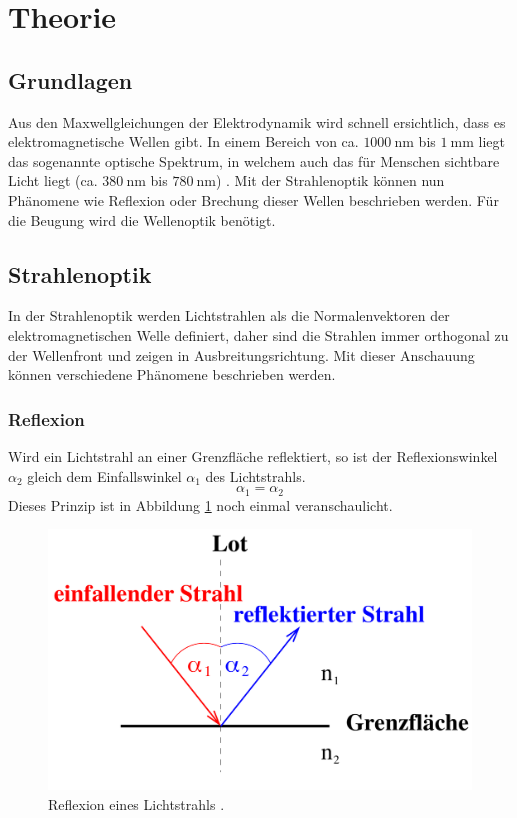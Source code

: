 \section{Theorie}
\label{sec:Theorie}

\subsection{Grundlagen}
\label{sec:grundlagen}
Aus den Maxwellgleichungen der Elektrodynamik wird schnell ersichtlich, dass es elektromagnetische Wellen
gibt. In einem Bereich von ca. $\SI{1000}{\nano\metre}$ bis $\SI{1}{\milli\metre}$ liegt das sogenannte
optische Spektrum, in welchem auch das für Menschen sichtbare Licht liegt (ca. $\SI{380}{\nano\metre}$
bis $\SI{780}{\nano\metre}$) \cite{AP01}. Mit der Strahlenoptik \label{sec:strahlen} können nun Phänomene wie Reflexion oder Brechung
dieser Wellen beschrieben werden. Für die Beugung wird die Wellenoptik \label{sec:welle} benötigt.
\subsection{Strahlenoptik}
In der Strahlenoptik werden Lichtstrahlen als die Normalenvektoren der elektromagnetischen Welle
definiert, daher sind die Strahlen immer orthogonal zu der Wellenfront und zeigen in Ausbreitungsrichtung.
Mit dieser Anschauung können verschiedene Phänomene beschrieben werden.

\subsubsection*{Reflexion}
\label{sec:reflexion}
Wird ein Lichtstrahl an einer Grenzfläche reflektiert, so ist der Reflexionswinkel $\alpha_2$ gleich dem
Einfallswinkel $\alpha_1$ des Lichtstrahls.
\begin{equation}
    \alpha_1=\alpha_2
    \label{eqn:reflexion}
\end{equation}
Dieses Prinzip ist in Abbildung \ref{fig:reflexion} noch einmal veranschaulicht.
\begin{figure}[H]
    \centering
    \includegraphics[scale = 0.3]{pictures/Reflexion.png}
    \caption{Reflexion eines Lichtstrahls \cite{AP01}.}
    \label{fig:reflexion}
\end{figure}

